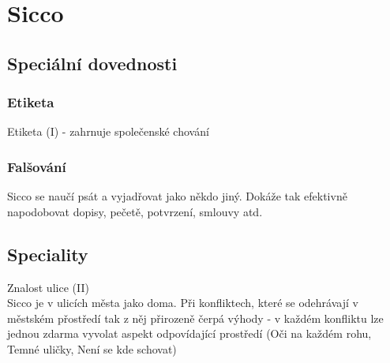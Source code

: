\documentclass[../main.tex]{subfiles}
\begin{document}
\section{Sicco}
\label{sec:sicco}

\subsection{Speciální dovednosti}
\label{sec:sicco-dovednosti}

\subsubsection{Etiketa}
\label{sec:sicco-etiketa}
Etiketa (I) - zahrnuje společenské chování\\

\subsubsection{Falšování}
\label{sec:sicco-falsovani}
Sicco se naučí psát a vyjadřovat jako někdo jiný. Dokáže tak efektivně napodobovat dopisy, pečetě, potvrzení, smlouvy atd. \\

\begin{akce}
\end{akce}


\subsection{Speciality}
\label{sec:sicco-speciality}

Znalost ulice (II)\\
Sicco je v ulicích města jako doma. Při konfliktech, které se odehrávají v městském přostředí tak z něj přirozeně čerpá výhody - v každém konfliktu lze jednou zdarma vyvolat aspekt odpovídající prostředí (Oči na každém rohu, Temné uličky, Není se kde schovat)\\
\end{document}
